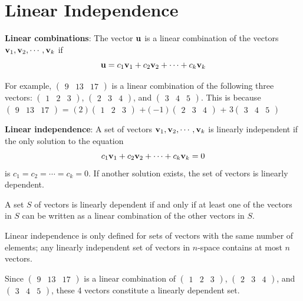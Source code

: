 \documentclass[
]{book}
\theoremstyle{definition}
\theoremstyle{definition}
\theoremstyle{definition}
\theoremstyle{remark}
\begin{document}
\hypertarget{linearindependence}{%
\section{Linear Independence}\label{linearindependence}}

\textbf{Linear combinations}: The vector \({\bf u}\) is a linear combination of the vectors \({\bf v}_1, {\bf v}_2, \cdots , {\bf v}_k\) if
\[{\bf u} = c_1{\bf v}_1 + c_2{\bf v}_2 +  \cdots + c_k{\bf v}_k\]

For example, \(\begin{pmatrix}9 & 13 & 17 \end{pmatrix}\) is a linear combination of the following three vectors: \(\begin{pmatrix}1 & 2 & 3 \end{pmatrix}\), \(\begin{pmatrix} 2 & 3& 4\end{pmatrix}\), and \(\begin{pmatrix} 3 & 4 & 5 \end{pmatrix}\). This is because \(\begin{pmatrix}9 & 13 & 17 \end{pmatrix}\) = \((2)\begin{pmatrix}1 & 2 & 3 \end{pmatrix}\) \(+ (-1)\begin{pmatrix} 2 & 3& 4\end{pmatrix}\) + \(3\begin{pmatrix} 3 & 4 & 5 \end{pmatrix}\)

\textbf{Linear independence}: A set of vectors \({\bf v}_1, {\bf v}_2, \cdots , {\bf v}_k\) is linearly independent if the only solution to the equation
\[c_1{\bf v}_1 + c_2{\bf v}_2 +  \cdots + c_k{\bf v}_k = 0\]
is \(c_1 = c_2 = \cdots = c_k = 0\). If another solution exists, the set of vectors is linearly dependent.

A set \(S\) of vectors is linearly dependent if and only if at least one of the vectors in \(S\) can be written as a linear combination of the other vectors in \(S\).

Linear independence is only defined for sets of vectors with the same number of elements; any linearly independent set of vectors in \(n\)-space contains at most \(n\) vectors.

Since \(\begin{pmatrix}9 & 13 & 17 \end{pmatrix}\) is a linear combination of \(\begin{pmatrix}1 & 2 & 3 \end{pmatrix}\), \(\begin{pmatrix} 2 & 3& 4\end{pmatrix}\), and \(\begin{pmatrix} 3 & 4 & 5 \end{pmatrix}\), these 4 vectors constitute a linearly dependent set.
\end{document}

